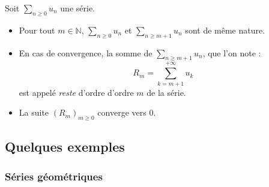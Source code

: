 \documentclass[french,11pt,twoside]{VcCours}
\newcommand{\Sum}[2]{\ensuremath{\textstyle{\sum\limits_{#1}^{#2}}}}
\begin{document}
\begin{TheoremeDefinition}{}
Soit $\Sum{n\geq 0}{} u_n$ une série.
\begin{itemize}
\item Pour tout $m \in \mathbb{N}$, $\Sum{n\geq 0}{}u_n$ et $\Sum{n\geq m+1}{}u_n$ sont de même nature.
\item En cas de convergence, la somme de $\Sum{n\geq m+1}{}u_n$, que l'on note :
$$ R_m = \sum_{k= m+1}^{+\infty}u_k$$
est appelé \emph{reste} d'ordre d'ordre $m$ de la série. 
\item La suite $(R_m)_{m \geq 0}$ converge vers $0$.
\end{itemize}
\end{TheoremeDefinition}
%
\begin{Demonstration}{}

\vspace{10cm}
%
\end{Demonstration}
%


\newpage
\subsection{Quelques exemples}
\subsubsection{Séries géométriques}
\end{document}
